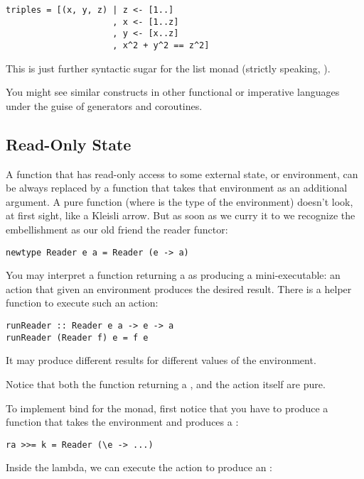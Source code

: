 \begin{Verbatim}[commandchars=\\\{\}]
triples = [(x, y, z) | z <- [1..]
                     , x <- [1..z]
                     , y <- [x..z]
                     , x^2 + y^2 == z^2]
\end{Verbatim}
This is just further syntactic sugar for the list monad (strictly
speaking, ).

You might see similar constructs in other functional or imperative
languages under the guise of generators and coroutines.

\subsection{Read-Only State}\label{read-only-state}

A function that has read-only access to some external state, or
environment, can be always replaced by a function that takes that
environment as an additional argument. A pure function
 (where  is the type of
the environment) doesn't look, at first sight, like a Kleisli arrow. But
as soon as we curry it to
 we recognize the
embellishment as our old friend the reader functor:

\begin{Verbatim}[commandchars=\\\{\}]
newtype Reader e a = Reader (e -> a)
\end{Verbatim}
You may interpret a function returning a  as producing a
mini-executable: an action that given an environment produces the
desired result. There is a helper function  to execute
such an action:

\begin{Verbatim}[commandchars=\\\{\}]
runReader :: Reader e a -> e -> a
runReader (Reader f) e = f e
\end{Verbatim}
It may produce different results for different values of the
environment.

Notice that both the function returning a , and the
 action itself are pure.

To implement bind for the  monad, first notice that you
have to produce a function that takes the environment  and
produces a :

\begin{Verbatim}
ra >>= k = Reader (\e -> ...)
\end{Verbatim}
Inside the lambda, we can execute the action  to produce an
:

